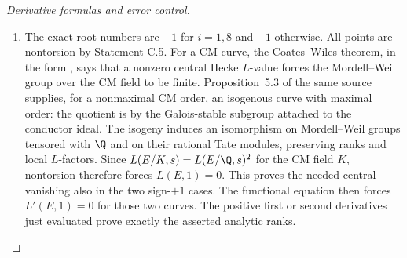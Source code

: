 \begin{proof}[Derivative formulas and error control]
\begin{enumerate}[label=\arabic*.,leftmargin=*]
\item The exact root numbers are $+1$ for $i=1,8$ and $-1$ otherwise.
All points are nontorsion by Statement C.5. For a CM curve,
the Coates--Wiles theorem, in the form
\citet[Theorem 10.1]{CrRubin1999}, says that a nonzero central
Hecke $L$-value forces the Mordell--Weil group over the CM field
to be finite. Proposition~5.3 of the same source supplies, for a nonmaximal CM order, an isogenous
curve with maximal order: the quotient is by the Galois-stable subgroup attached to the conductor ideal. The isogeny induces an isomorphism on Mordell--Weil groups tensored with $\Q$ and on their rational Tate modules, preserving ranks and local $L$-factors.
Since $L(E/K,s)=L(E/\Q,s)^2$ for the CM field $K$, nontorsion
therefore forces $L(E,1)=0$. This proves the needed central
vanishing also in the two sign-$+1$ cases. The functional equation
then forces $L'(E,1)=0$ for those two curves. The positive first
or second derivatives just evaluated prove exactly the asserted
analytic ranks.
\end{enumerate}
\end{proof}